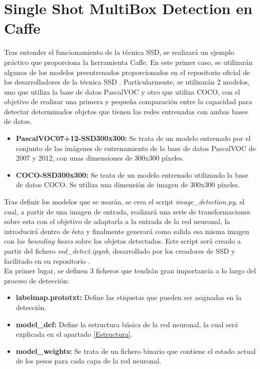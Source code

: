 \documentclass[a4paper, 12pt, oneside]{book}
\begin{document}
\section{Single Shot MultiBox Detection en Caffe}\label{SSDCaffe}

Tras entender el funcionamiento de la técnica SSD, se realizará un ejemplo práctico que proporciona la herramienta Caffe. En este primer caso, se utilizarán algunos de los modelos preentrenados proporcionados en el repositorio oficial de los desarrolladores de la técnica SSD \cite{CaffeSSD}. Particularmente, se utilizarán 2 modelos, uno que utiliza la base de datos PascalVOC y otro que utiliza COCO, con el objetivo de realizar una primera y pequeña comparación entre la capacidad para detectar determinados objetos que tienen las redes entrenadas con ambas bases de datos.

\begin{itemize}
\item \textbf{PascalVOC07+12-SSD300x300:} Se trata de un modelo entrenado por el conjunto de las imágenes de entrenamiento de la base de datos PascalVOC de 2007 y 2012, con unas dimensiones de 300x300 píxeles.
\item \textbf{COCO-SSD300x300:} Se trata de un modelo entrenado utilizando la base de datos COCO. Se utiliza una dimensión de imagen de 300x300 píxeles.
\end{itemize}

Tras definir los modelos que se usarán, se crea el script \textit{image\_detection.py}, el cual, a partir de una imagen de entrada, realizará una serie de transformaciones sobre esta con el objetivo de adaptarla a la entrada de la red neuronal, la introducirá dentro de ésta y finalmente generará como salida esa misma imagen con las \textit{bounding boxes} sobre los objetos detectados. Este script será creado a partir del fichero \textit{ssd\_detect.ipynb}, desarrollado por los creadores de SSD y facilitado en su repositorio \cite{CaffeSSD}.\\

En primer lugar, se definen 3 ficheros que tendrán gran importancia a lo largo del proceso de detección:

\begin{itemize}
\item \textbf{labelmap.prototxt:} Define las etiquetas que pueden ser asignadas en la detección.
\item \textbf{model\_def:} Define la estructura básica de la red neuronal, la cual será explicada en el apartado \ref{Estructura}.
\item \textbf{model\_weights:} Se trata de un fichero binario que contiene el estado actual de los pesos para cada capa de la red neuronal.
\end{itemize}
\end{document}

